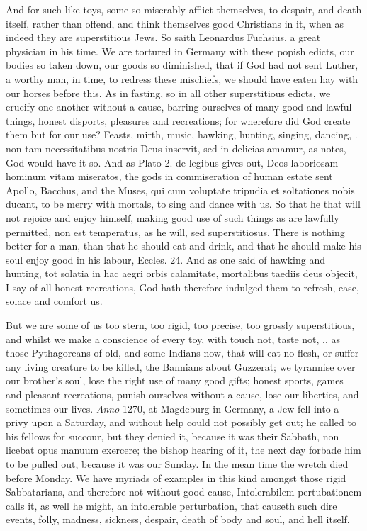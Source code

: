 {And for such like toys, some so miserably afflict themselves, to
despair, and death itself, rather than offend, and think themselves
good Christians in it, when as indeed they are superstitious Jews. So
saith Leonardus Fuchsius, a great physician in his time. We are
tortured in Germany with these popish edicts, our bodies so taken down,
our goods so diminished, that if God had not sent Luther, a worthy man,
in time, to redress these mischiefs, we should have eaten hay with our
horses before this. As in fasting, so in all other superstitious
edicts, we crucify one another without a cause, barring ourselves of
many good and lawful things, honest disports, pleasures and
recreations; for wherefore did God create them but for our use? Feasts,
mirth, music, hawking, hunting, singing, dancing, \etc{}. non tam
necessitatibus nostris Deus inservit, sed in delicias amamur, as \Seneca
notes, God would have it so. And as Plato 2. de legibus gives out, Deos
laboriosam hominum vitam miseratos, the gods in commiseration of human
estate sent Apollo, Bacchus, and the Muses, qui cum voluptate tripudia
et soltationes nobis ducant, to be merry with mortals, to sing and
dance with us. So that he that will not rejoice and enjoy himself,
making good use of such things as are lawfully permitted, non est
temperatus, as he will, sed superstitiosus. There is nothing better for
a man, than that he should eat and drink, and that he should make his
soul enjoy good in his labour, Eccles.  24. And as one said of
hawking and hunting, tot solatia in hac aegri orbis calamitate,
mortalibus taediis deus objecit, I say of all honest recreations, God
hath therefore indulged them to refresh, ease, solace and comfort us.

But we are some of us too stern, too rigid, too precise, too grossly
superstitious, and whilst we make a conscience of every toy, with touch
not, taste not, \etc{}., as those Pythagoreans of old, and some Indians
now, that will eat no flesh, or suffer any living creature to be
killed, the Bannians about Guzzerat; we tyrannise over our brother's
soul, lose the right use of many good gifts; honest sports, games
and pleasant recreations, punish ourselves without a cause, lose
our liberties, and sometimes our lives. \emph{Anno} 1270, at Magdeburg
in Germany, a Jew fell into a privy upon a Saturday, and without help
could not possibly get out; he called to his fellows for succour, but
they denied it, because it was their Sabbath, non licebat opus manuum
exercere; the bishop hearing of it, the next day forbade him to be
pulled out, because it was our Sunday. In the mean time the wretch died
before Monday. We have myriads of examples in this kind amongst those
rigid Sabbatarians, and therefore not without good cause,
Intolerabilem pertubationem \Seneca calls it, as well he might, an
intolerable perturbation, that causeth such dire events, folly,
madness, sickness, despair, death of body and soul, and hell itself.

}
